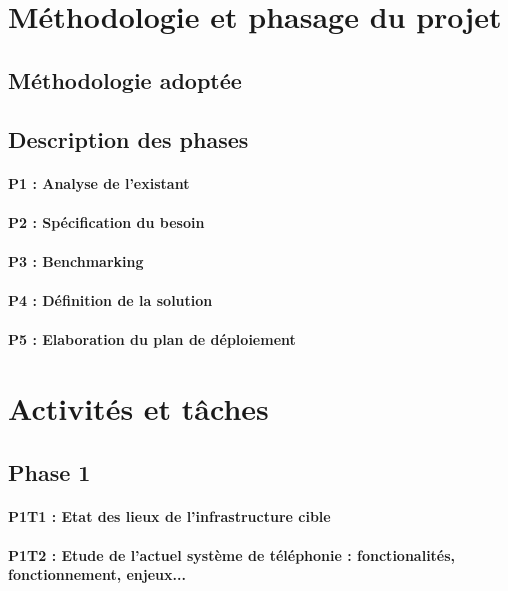 \section{Méthodologie et phasage du projet}

\subsection{Méthodologie adoptée}

\subsection{Description des phases}

\paragraph{P1 : Analyse de l'existant}
\paragraph{P2 : Spécification du besoin}
\paragraph{P3 : Benchmarking}
\paragraph{P4 : Définition de la solution}
\paragraph{P5 : Elaboration du plan de déploiement}

\section{Activités et tâches}

\subsection{Phase 1}
\paragraph{P1T1 : Etat des lieux de l'infrastructure cible}
\paragraph{P1T2 : Etude de l'actuel système de téléphonie : fonctionalités, fonctionnement, enjeux... }
